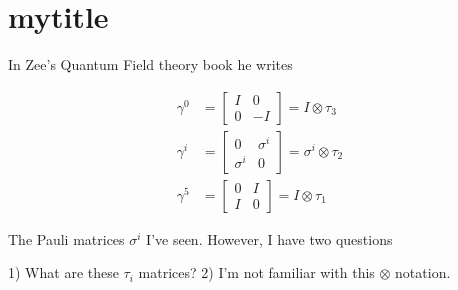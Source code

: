 
%

\chapter{mytitle}
\label{chap:template}
{}
\date{May X, 2011}

\beginArtWithToc

In Zee's Quantum Field theory book he writes

\begin{align*}
\gamma^0 &= 
\begin{bmatrix}
I & 0 \\
0 & -I
\end{bmatrix}
=
I \otimes \tau_3 \\
\gamma^i &= 
\begin{bmatrix}
0 & \sigma^i \\
\sigma^i & 0
\end{bmatrix}
=
\sigma^i \otimes \tau_2 \\
\gamma^5 &=
\begin{bmatrix}
0 & I \\
I & 0
\end{bmatrix}
=
I \otimes \tau_1 
\end{align*}

The Pauli matrices $\sigma^i$ I've seen.  However, I have two questions

1) What are these $\tau_i$ matrices?
2) I'm not familiar with this $\otimes$ notation.

\EndArticle
